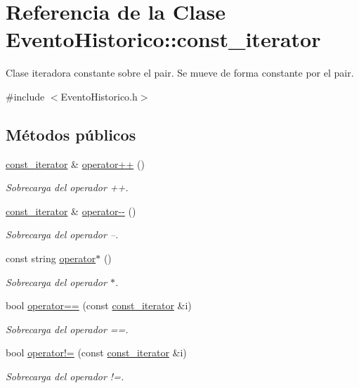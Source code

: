 \hypertarget{classEventoHistorico_1_1const__iterator}{}\section{Referencia de la Clase Evento\+Historico\+:\+:const\+\_\+iterator}
\label{classEventoHistorico_1_1const__iterator}


Clase iteradora constante sobre el pair. Se mueve de forma constante por el pair.  




{\ttfamily \#include $<$Evento\+Historico.\+h$>$}

\subsection*{Métodos públicos}
\begin{DoxyCompactItemize}
\item 
\hyperlink{classEventoHistorico_1_1const__iterator}{const\+\_\+iterator} \& \hyperlink{classEventoHistorico_1_1const__iterator_ac61db745de3874f53f9b0e4086f02195}{operator++} ()
\begin{DoxyCompactList}\small\item\em Sobrecarga del operador ++. \end{DoxyCompactList}\item 
\hyperlink{classEventoHistorico_1_1const__iterator}{const\+\_\+iterator} \& \hyperlink{classEventoHistorico_1_1const__iterator_a548f98c2a2fece094500096b991970a0}{operator-\/-\/} ()
\begin{DoxyCompactList}\small\item\em Sobrecarga del operador --. \end{DoxyCompactList}\item 
const string \hyperlink{classEventoHistorico_1_1const__iterator_a2b037cb7509ddf4ff0972ceded59c13b}{operator$\ast$} ()
\begin{DoxyCompactList}\small\item\em Sobrecarga del operador $\ast$. \end{DoxyCompactList}\item 
bool \hyperlink{classEventoHistorico_1_1const__iterator_a6f68d0b043b55b7ff3ae73e4da86861a}{operator==} (const \hyperlink{classEventoHistorico_1_1const__iterator}{const\+\_\+iterator} \&i)
\begin{DoxyCompactList}\small\item\em Sobrecarga del operador ==. \end{DoxyCompactList}\item 
bool \hyperlink{classEventoHistorico_1_1const__iterator_a6ed8849e4fde8aff53c0e487bddb22c6}{operator!=} (const \hyperlink{classEventoHistorico_1_1const__iterator}{const\+\_\+iterator} \&i)
\begin{DoxyCompactList}\small\item\em Sobrecarga del operador !=. \end{DoxyCompactList}\end{DoxyCompactItemize}

